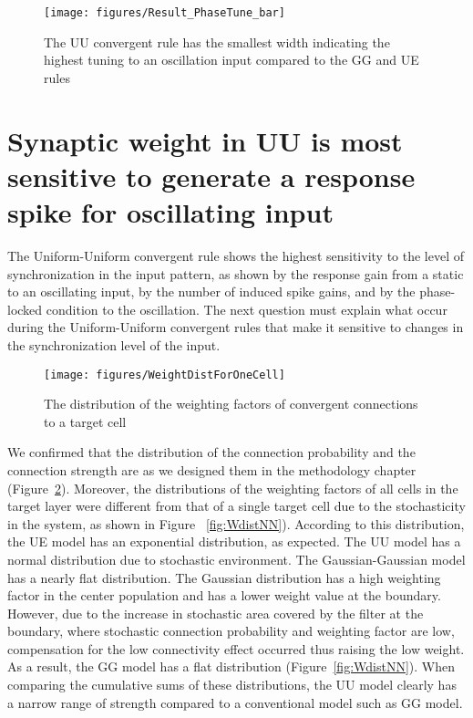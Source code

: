 \begin{figure}[!h]
	\centering
	\texttt{[image: figures/Result\_PhaseTune\_bar]}
	\caption{The UU convergent rule has the smallest width indicating the highest tuning to an oscillation input compared to the GG and UE rules} 
	\label{fig:PhaseBar}
\end{figure}

\section{Synaptic weight in UU is most sensitive to generate a response spike for oscillating input}
 The Uniform-Uniform convergent rule shows the highest sensitivity to the level of synchronization in the input pattern, as shown by the response gain from a static to an oscillating input, by the number of induced spike gains, and by the phase-locked condition to the oscillation. The next question must explain what occur during the Uniform-Uniform convergent rules that make it sensitive to changes in the synchronization level of the input.

\begin{figure}[!h]
	\centering
	\texttt{[image: figures/WeightDistForOneCell]}
	\caption{The distribution of the weighting factors of convergent connections to a target cell} 
	\label{fig:WdistOne}
\end{figure}

 We confirmed that the distribution of the connection probability and the connection strength are as we designed them in the methodology chapter (Figure~\ref{fig:WdistOne}). Moreover, the distributions of the weighting factors of all cells in the target layer were different from that of a single target cell due to the stochasticity in the system, as shown in Figure ~\ref{fig:WdistNN}). According to this distribution, the UE model has an exponential distribution, as expected. The UU model has a normal distribution due to stochastic environment. The Gaussian-Gaussian model has a nearly flat distribution. The Gaussian distribution has a high weighting factor in the center population and has a lower weight value at the boundary. However, due to the increase in stochastic area covered by the filter at the boundary, where stochastic connection probability and weighting factor are low, compensation for the low connectivity effect occurred thus raising the low weight. As a result, the GG model has a flat distribution (Figure~\ref{fig:WdistNN}). When comparing the cumulative sums of these distributions, the UU model clearly has a narrow range of strength compared to a conventional model such as GG model.

